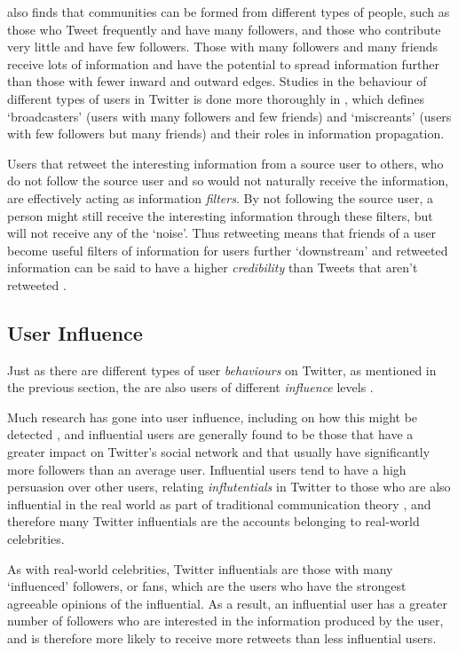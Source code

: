 \cite{java07} also finds that communities can be formed from different types of people, such as those who Tweet frequently and have many followers, and those who contribute very little and have few followers. Those with many followers and many friends receive lots of information and have the potential to spread information further than those with fewer inward and outward edges. Studies in the behaviour of different types of users in Twitter is done more thoroughly in \cite{krishnamurthy08}, which defines `broadcasters' (users with many followers and few friends) and `miscreants' (users with few followers but many friends) and their roles in information propagation.

Users that retweet the interesting information from a source user to others, who do not follow the source user and so would not naturally receive the information, are effectively acting as information \textit{filters}. By not following the source user, a person might still receive the interesting information through these filters, but will not receive any of the `noise'. Thus retweeting means that friends of a user become useful filters of information for users further `downstream'  and retweeted information can be said to have a higher \textit{credibility} than Tweets that aren't retweeted \cite{castillo11}.


\subsection{User Influence}
Just as there are different types of user \textit{behaviours} on Twitter, as mentioned in the previous section, the are also users of different \textit{influence} levels \cite{quercia11}.

Much research has gone into user influence, including on how this might be detected \cite{yu11}, and influential users are generally found to be those that have a greater impact on Twitter's social network \cite{bakshy11} and that usually have significantly more followers than an average user. Influential users tend to have a high persuasion over other users, relating \textit{influtentials} in Twitter to those who are also influential in the real world as part of traditional communication theory \cite{cha10}, and therefore many Twitter influentials are the accounts belonging to real-world celebrities.

As with real-world celebrities, Twitter influentials are those with many `influenced' followers, or fans, which are the users who have the strongest agreeable opinions of the influential. As a result, an influential user has a greater number of followers who are interested in the information produced by the user, and is therefore more likely to receive more retweets than less influential users.

